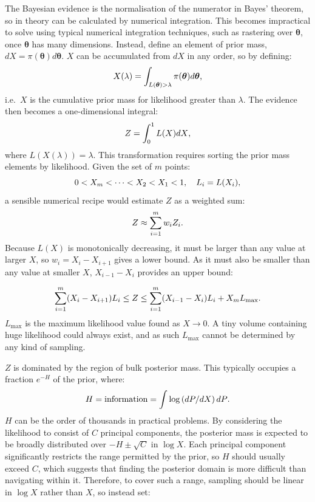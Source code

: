 \documentclass{article}
\begin{document}
The Bayesian evidence is the normalisation of the numerator in Bayes' theorem, so in theory can be calculated by numerical integration. This becomes impractical to solve using typical numerical integration techniques, such as rastering over $\bm\theta$, once $\bm\theta$ has many dimensions. Instead, define an element of prior mass, $dX = \pi(\bm\theta)d\bm\theta$. $X$ can be accumulated from $dX$ in any order, so by defining:
%
\begin{equation}
  X(\lambda) = \int_{L(\bm\theta)>\lambda} \pi(\bm\theta)d\bm\theta\textrm,
\end{equation}
%
i.e.\ $X$ is the cumulative prior mass for likelihood greater than $\lambda$. The evidence then becomes a one-dimensional integral:
%
\begin{equation}
  Z = \int_0^1 L(X) dX\textrm,
\end{equation}
%
where $L(X(\lambda)) = \lambda$. This transformation requires sorting the prior mass elements by likelihood. Given the set of $m$ points:
\begin{equation}
  0<X_m<\dots<X_2<X_1<1, \quad L_i = L(X_i)\textrm,
\end{equation}
%
a sensible numerical recipe would estimate $Z$ as a weighted sum:
%
\begin{equation}
  Z \approx \sum_{i=1}^m w_i Z_i\textrm.
\end{equation}
%
Because $L(X)$ is monotonically decreasing, it must be larger than any value at larger $X$, so $w_i=X_i-X_{i+1}$ gives a lower bound. As it must also be smaller than any value at smaller $X$, $X_{i-1}-X_i$ provides an upper bound:

\begin{equation}
  \sum_{i=1}^m (X_i-X_{i+1})L_i \le Z \le \sum_{i=1}^m (X_{i-1}-X_i)L_i + X_mL_\textrm{max}\textrm.
\end{equation}
%
$L_\textrm{max}$ is the maximum likelihood value found as $X\to0$. A tiny volume containing huge likelihood could always exist, and as such $L_\textrm{max}$ cannot be determined by any kind of sampling.
 
$Z$ is dominated by the region of bulk posterior mass. This typically occupies a fraction $e^{-H}$ of the prior, where:
%
\begin{equation}
  H = \textrm{information} = \int \log\left(dP/dX\right)dP\textrm.
\end{equation}
%
$H$ can be the order of thousands in practical problems. By considering the likelihood to consist of $C$ principal components, the posterior mass is expected to be broadly distributed over $-H\pm\sqrt{C}$ in $\log X$. Each principal component significantly restricts the range permitted by the prior, so $H$ should usually exceed $C$, which suggests that finding the posterior domain is more difficult than navigating within it. Therefore, to cover such a range, sampling should be linear in $\log X$ rather than $X$, so instead set:
\end{document}
